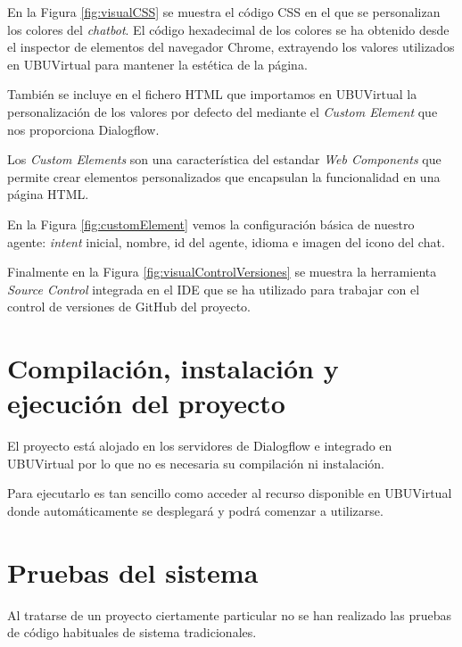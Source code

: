 
En la Figura \ref{fig:visualCSS} se muestra el código CSS en el que se personalizan los colores del \textit{chatbot}. El código hexadecimal de los colores se ha obtenido desde el inspector de elementos del navegador Chrome, extrayendo los valores utilizados en UBUVirtual para mantener la estética de la página.

También se incluye en el fichero HTML que importamos en UBUVirtual la personalización de los valores por defecto del  mediante el \textit{Custom Element} que nos proporciona Dialogflow.

Los \textit{Custom Elements} son una característica del estandar \textit{Web Components} que permite crear elementos personalizados que encapsulan la funcionalidad en una página HTML. \cite{customElements}

En la Figura \ref{fig:customElement} vemos la configuración básica de nuestro agente: \textit{intent} inicial, nombre, id del agente, idioma e imagen del icono del chat.


Finalmente en la Figura \ref{fig:visualControlVersiones} se muestra la herramienta \textit{Source Control} integrada en el IDE que se ha utilizado para trabajar con el control de versiones de GitHub del proyecto. 





\section{Compilación, instalación y ejecución del proyecto}

El proyecto está alojado en los servidores de Dialogflow e integrado en UBUVirtual por lo que no es necesaria su compilación ni instalación.

Para ejecutarlo es tan sencillo como acceder al recurso disponible en UBUVirtual donde automáticamente se desplegará y podrá comenzar a utilizarse.


\section{Pruebas del sistema}

Al tratarse de un proyecto ciertamente particular no se han realizado las pruebas de código habituales de sistema tradicionales.

